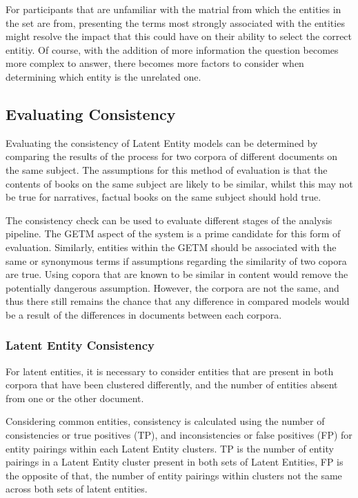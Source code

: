 \documentclass[10pt]{report}
\begin{document}
For participants that are unfamiliar with the matrial from which the entities in the set are from, presenting the terms most strongly associated with the entities might resolve the impact that this could have on their ability to select the correct entitiy. Of course, with the addition of more information the question becomes more complex to answer, there becomes more factors to consider when determining which entity is the unrelated one.


\subsection{Evaluating Consistency}
Evaluating the consistency of Latent Entity models can be determined by comparing the results of the process for two corpora of different documents on the same subject. The assumptions for this method of evaluation is that the contents of books on the same subject are likely to be similar, whilst this may not be true for narratives, factual books on the same subject should hold true.

The consistency check can be used to evaluate different stages of the analysis pipeline. The GETM aspect of the system is a prime candidate for this form of evaluation. Similarly, entities within the GETM should be associated with the same or synonymous terms if assumptions regarding the similarity of two copora are true. Using copora that are known to be similar in content would remove the potentially dangerous assumption. However, the corpora are not the same, and thus there still remains the chance that any difference in compared models would be a result of the differences in documents between each corpora.

\subsubsection{Latent Entity Consistency}
For latent entities, it is necessary to consider entities that are present in both corpora that have been clustered differently, and the number of entities absent from one or the other document.

Considering common entities, consistency is calculated using the number of consistencies or true positives (TP), and inconsistencies or false positives (FP) for entity pairings within each Latent Entity clusters. TP is the number of entity pairings in a Latent Entity cluster present in both sets of Latent Entities, FP is the opposite of that, the number of entity pairings within clusters not the same across both sets of latent entities.
\end{document}
